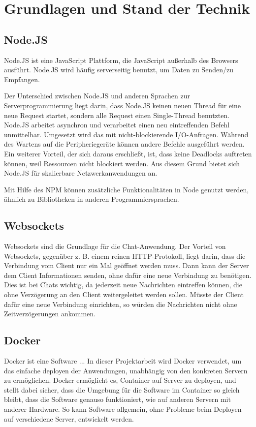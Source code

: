 
\chapter{Grundlagen und Stand der Technik}\label{cha:Grundlagen}
\section{Node.JS}\label{sec:Node.JS}
Node.JS ist eine JavaScript Plattform, die JavaScript außerhalb des Browsers ausführt. Node.JS wird häufig serverseitig benutzt, um Daten zu Senden/zu Empfangen.

Der Unterschied zwischen Node.JS und anderen Sprachen zur Serverprogrammierung liegt darin, dass Node.JS keinen neuen Thread für eine neue Request startet, sondern alle Request einen Single-Thread benutzten. Node.JS arbeitet asynchron und verarbeitet einen neu eintreffenden Befehl unmittelbar. Umgesetzt wird das mit nicht-blockierende I/O-Anfragen. Während des Wartens auf die Peripheriegeräte können andere Befehle ausgeführt werden. Ein weiterer Vorteil, der sich daraus erschließt, ist, dass keine Deadlocks auftreten können, weil Ressourcen nicht blockiert werden. Aus diesem Grund bietet sich Node.JS für skalierbare Netzwerkanwendungen an.

Mit Hilfe des \acf{NPM} können zusätzliche Funktionalitäten in Node genutzt werden, ähnlich zu Bibliotheken in anderen Programmiersprachen.


\section{Websockets}\label{sec:Websockets}
Websockets sind die Grundlage für die Chat-Anwendung. Der Vorteil von Websockets, gegenüber z. B. einem reinen \ac{HTTP}-Protokoll, liegt darin, dass die Verbindung vom Client nur ein Mal geöffnet werden muss. Dann kann der Server dem Client Informationen senden, ohne dafür eine neue Verbindung zu benötigen. Dies ist bei Chats wichtig, da jederzeit neue Nachrichten eintreffen können, die ohne Verzögerung an den Client weitergeleitet werden sollen. Müsste der Client dafür eine neue Verbindung einrichten, so würden die Nachrichten nicht ohne Zeitverzögerungen ankommen.
\section{Docker}\label{sec:Docker}
Docker ist eine Software ... In dieser Projektarbeit wird Docker verwendet, um das einfache deployen der Anwendungen, unabhängig von den konkreten Servern zu ermöglichen. Docker ermöglicht es, Container auf Server zu deployen, und stellt dabei sicher, dass die Umgebung für die Software im Container so gleich bleibt, dass die Software genauso funktioniert, wie auf anderen Servern mit anderer Hardware. So kann Software allgemein, ohne Probleme beim Deployen auf verschiedene Server, entwickelt werden.
